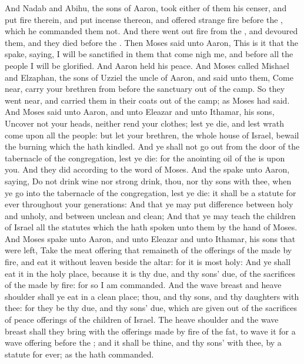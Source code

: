 \begin{biblechapter} %
 And Nadab and Abihu, the sons of Aaron, took either of them his censer, and put fire therein, and put incense thereon, and offered strange fire before the \LORD, which he commanded them not.
\verse And there went out fire from the \LORD, and devoured them, and they died before the \LORD.
\verse Then Moses said unto Aaron, This is it that the \LORD spake, saying, I will be sanctified in them that come nigh me, and before all the people I will be glorified. And Aaron held his peace.
\verse And Moses called Mishael and Elzaphan, the sons of Uzziel the uncle of Aaron, and said unto them, Come near, carry your brethren from before the sanctuary out of the camp.
\verse So they went near, and carried them in their coats out of the camp; as Moses had said.
\verse And Moses said unto Aaron, and unto Eleazar and unto Ithamar, his sons, Uncover not your heads, neither rend your clothes; lest ye die, and lest wrath come upon all the people: but let your brethren, the whole house of Israel, bewail the burning which the \LORD hath kindled.
\verse And ye shall not go out from the door of the tabernacle of the congregation, lest ye die: for the anointing oil of the \LORD is upon you. And they did according to the word of Moses.
\verse And the \LORD spake unto Aaron, saying,
\verse Do not drink wine nor strong drink, thou, nor thy sons with thee, when ye go into the tabernacle of the congregation, lest ye die: it shall be a statute for ever throughout your generations:
\verse And that ye may put difference between holy and unholy, and between unclean and clean;
\verse And that ye may teach the children of Israel all the statutes which the \LORD hath spoken unto them by the hand of Moses.
\verse And Moses spake unto Aaron, and unto Eleazar and unto Ithamar, his sons that were left, Take the meat offering that remaineth of the offerings of the \LORD made by fire, and eat it without leaven beside the altar: for it is most holy:
\verse And ye shall eat it in the holy place, because it is thy due, and thy sons' due, of the sacrifices of the \LORD made by fire: for so I am commanded.
\verse And the wave breast and heave shoulder shall ye eat in a clean place; thou, and thy sons, and thy daughters with thee: for they be thy due, and thy sons' due, which are given out of the sacrifices of peace offerings of the children of Israel.
\verse The heave shoulder and the wave breast shall they bring with the offerings made by fire of the fat, to wave it for a wave offering before the \LORD; and it shall be thine, and thy sons' with thee, by a statute for ever; as the \LORD hath commanded.

\end{biblechapter}
